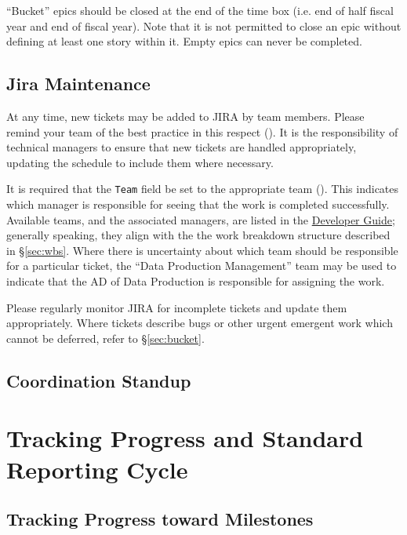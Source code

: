 ``Bucket'' epics should be closed at the end of the time box (i.e. end of half fiscal year and end of fiscal year).
Note that it is not permitted to close an \gls{epic} without defining at least one \gls{story} within it.
Empty \glspl{epic} can never be completed.


\subsection{Jira Maintenance}
\label{sec:jira-maintenance}

At any time, new tickets may be added to \gls{JIRA} by team members.
Please remind your team of the best practice in this respect ().
It is the responsibility of technical managers to ensure that new tickets are handled appropriately, updating the schedule to include them where necessary.

It is required that the \texttt{Team} field be set to the appropriate team ().
This indicates which manager is responsible for \gls{seeing} that the work is completed successfully.
Available teams, and the associated managers, are listed in the \href{https://developer.lsst.io/processes/jira_agile.html}{Developer Guide}; generally speaking, they align with the the work breakdown structure described in \S\ref{sec:wbs}.
Where there is uncertainty about which team should be responsible for a particular ticket, the “Data Production Management” team may be used to indicate that the \gls{AD} of Data Production is responsible for assigning the work.

Please regularly monitor \gls{JIRA} for incomplete tickets and update them appropriately.
Where tickets describe bugs or other urgent emergent work which cannot be deferred, refer to \S\ref{sec:bucket}.

\subsection{Coordination Standup}
\label{sec:sup}


\section{Tracking Progress and Standard Reporting Cycle}
\label{sec:reporting-cycle}

\subsection{Tracking Progress toward Milestones}
\label{sec:track-progress}

